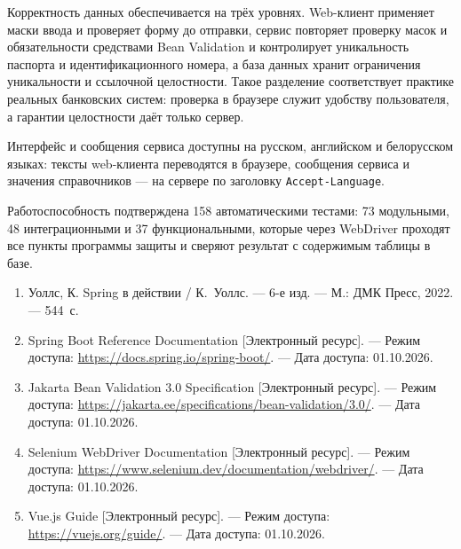 \documentclass[14pt,a4paper]{extarticle}
\begin{document}
Корректность данных обеспечивается на трёх уровнях. Web-клиент применяет маски ввода и
проверяет форму до отправки, сервис повторяет проверку масок и обязательности средствами
Bean Validation и контролирует уникальность паспорта и идентификационного номера, а база
данных хранит ограничения уникальности и ссылочной целостности. Такое разделение
соответствует практике реальных банковских систем: проверка в браузере служит удобству
пользователя, а гарантии целостности даёт только сервер.

Интерфейс и сообщения сервиса доступны на русском, английском и белорусском языках:
тексты web-клиента переводятся в браузере, сообщения сервиса и значения справочников --- на
сервере по заголовку \texttt{Accept-Language}.

Работоспособность подтверждена 158 автоматическими тестами: 73 модульными, 48
интеграционными и 37 функциональными, которые через WebDriver проходят все пункты программы
защиты и сверяют результат с содержимым таблицы в базе.


\begin{enumerate}
\item Уоллс, К. Spring в действии / К.~Уоллс. --- 6-е изд. --- М.: ДМК Пресс, 2022. --- 544~с.
\item Spring Boot Reference Documentation [Электронный ресурс]. --- Режим доступа:
\url{https://docs.spring.io/spring-boot/}. --- Дата доступа: 01.10.2026.
\item Jakarta Bean Validation 3.0 Specification [Электронный ресурс]. --- Режим доступа:
\url{https://jakarta.ee/specifications/bean-validation/3.0/}. --- Дата доступа: 01.10.2026.
\item Selenium WebDriver Documentation [Электронный ресурс]. --- Режим доступа:
\url{https://www.selenium.dev/documentation/webdriver/}. --- Дата доступа: 01.10.2026.
\item Vue.js Guide [Электронный ресурс]. --- Режим доступа: \url{https://vuejs.org/guide/}. ---
Дата доступа: 01.10.2026.
\end{enumerate}



\end{document}
